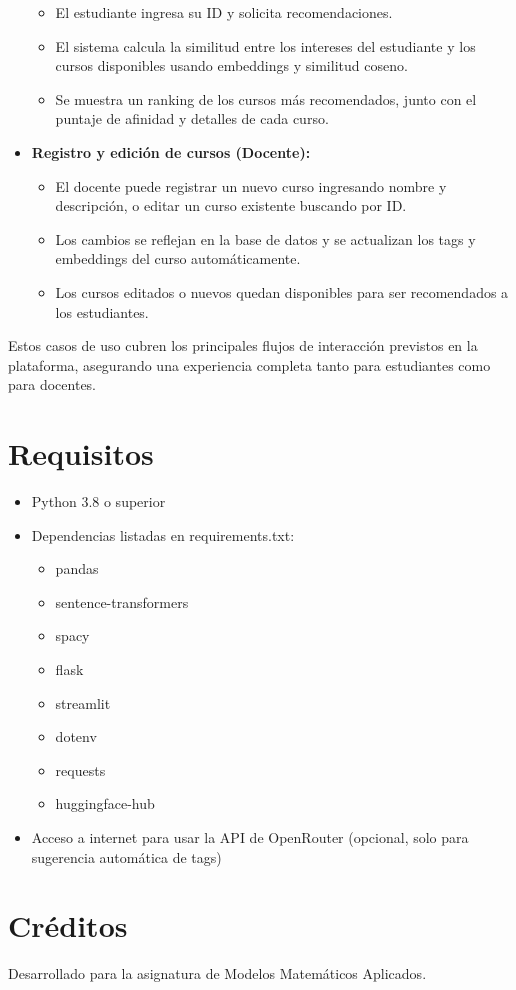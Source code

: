 \documentclass[12pt]{article}
\begin{document}
\begin{itemize}
    \begin{itemize}
        \item El estudiante ingresa su ID y solicita recomendaciones.
        \item El sistema calcula la similitud entre los intereses del estudiante y los cursos disponibles usando embeddings y similitud coseno.
        \item Se muestra un ranking de los cursos más recomendados, junto con el puntaje de afinidad y detalles de cada curso.
    \end{itemize}
    \item \textbf{Registro y edición de cursos (Docente):}
    \begin{itemize}
        \item El docente puede registrar un nuevo curso ingresando nombre y descripción, o editar un curso existente buscando por ID.
        \item Los cambios se reflejan en la base de datos y se actualizan los tags y embeddings del curso automáticamente.
        \item Los cursos editados o nuevos quedan disponibles para ser recomendados a los estudiantes.
    \end{itemize}
\end{itemize}

Estos casos de uso cubren los principales flujos de interacción previstos en la plataforma, asegurando una experiencia completa tanto para estudiantes como para docentes.

\section{Requisitos}
\begin{itemize}
    \item Python 3.8 o superior
    \item Dependencias listadas en requirements.txt:
    \begin{itemize}
        \item pandas
        \item sentence-transformers
        \item spacy
        \item flask
        \item streamlit
        \item dotenv
        \item requests
        \item huggingface-hub
    \end{itemize}
    \item Acceso a internet para usar la API de OpenRouter (opcional, solo para sugerencia automática de tags)
\end{itemize}

\section{Créditos}
Desarrollado para la asignatura de Modelos Matemáticos Aplicados.
\end{document}

